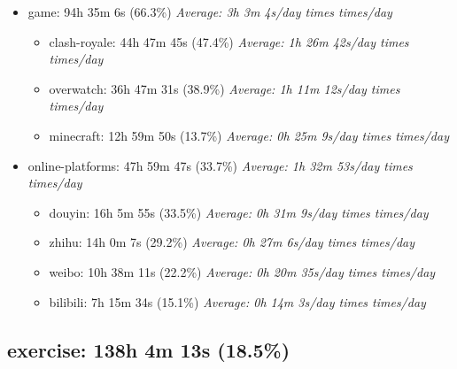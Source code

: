 \documentclass[12pt]{extarticle}
\begin{document}
\begin{itemize}[topsep=0pt, itemsep=-0.5ex]
    \item game: 94h 35m 6s (66.3\%)
        \textit{Average: 3h 3m 4s/day  times  times/day}\par
\begin{itemize}[topsep=0pt, itemsep=-0.5ex]
    \item clash-royale: 44h 47m 45s (47.4\%)
        \textit{Average: 1h 26m 42s/day  times  times/day}\par
    \item overwatch: 36h 47m 31s (38.9\%)
        \textit{Average: 1h 11m 12s/day  times  times/day}\par
    \item minecraft: 12h 59m 50s (13.7\%)
        \textit{Average: 0h 25m 9s/day  times  times/day}\par
\end{itemize}
    \item online-platforms: 47h 59m 47s (33.7\%)
        \textit{Average: 1h 32m 53s/day  times  times/day}\par
\begin{itemize}[topsep=0pt, itemsep=-0.5ex]
    \item douyin: 16h 5m 55s (33.5\%)
        \textit{Average: 0h 31m 9s/day  times  times/day}\par
    \item zhihu: 14h 0m 7s (29.2\%)
        \textit{Average: 0h 27m 6s/day  times  times/day}\par
    \item weibo: 10h 38m 11s (22.2\%)
        \textit{Average: 0h 20m 35s/day  times  times/day}\par
    \item bilibili: 7h 15m 34s (15.1\%)
        \textit{Average: 0h 14m 3s/day  times  times/day}\par
\end{itemize}
\end{itemize}
{\fontsize{16}{19.2}\selectfont\subsection*{exercise: 138h 4m 13s (18.5\%)}}
\end{document}
